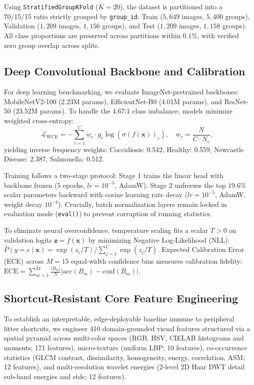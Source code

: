 \documentclass[conference]{IEEEtran}
\begin{document}
Using \texttt{StratifiedGroupKFold} ($K=20$), the dataset is partitioned into a 70/15/15 ratio strictly grouped by \texttt{group\_id}: Train ($5{,}649$ images, $5{,}400$ groups), Validation ($1{,}209$ images, $1{,}156$ groups), and Test ($1{,}209$ images, $1{,}158$ groups). All class proportions are preserved across partitions within $0.1\%$, with verified zero group overlap across splits.

\subsection{Deep Convolutional Backbone and Calibration}
For deep learning benchmarking, we evaluate ImageNet-pretrained backbones: MobileNetV2-100 (2.23M params), EfficientNet-B0 (4.01M params), and ResNet-50 (23.52M params). To handle the 4.67:1 class imbalance, models minimize weighted cross-entropy:
\begin{equation}
\mathcal{L}_{\text{WCE}} = - \sum_{c=1}^C w_c \cdot y_c \log(\sigma(f(\mathbf{x}))_c), \quad w_c = \frac{N}{C \cdot N_c},
\end{equation}
yielding inverse frequency weights: Coccidiosis: 0.542, Healthy: 0.559, Newcastle Disease: 2.387, Salmonella: 0.512.

Training follows a two-stage protocol: Stage 1 trains the linear head with backbone frozen ($5$ epochs, $lr = 10^{-3}$, AdamW). Stage 2 unfreezes the top $19.6\%$ scalar parameters backward with cosine learning rate decay ($lr = 10^{-5}$, AdamW, weight decay $10^{-4}$). Crucially, batch normalization layers remain locked in evaluation mode (\texttt{eval()}) to prevent corruption of running statistics.

To eliminate neural overconfidence, temperature scaling fits a scalar $T > 0$ on validation logits $\mathbf{z} = f(\mathbf{x})$ by minimizing Negative Log-Likelihood (NLL): $\hat{P}(y = c \mid \mathbf{x}) = \exp(z_c / T) / \sum_{j=1}^C \exp(z_j / T)$. Expected Calibration Error (ECE) across $M=15$ equal-width confidence bins measures calibration fidelity: $\text{ECE} = \sum_{m=1}^M \frac{|B_m|}{N} | \text{acc}(B_m) - \text{conf}(B_m) |$.

\subsection{Shortcut-Resistant Core Feature Engineering}
To establish an interpretable, edge-deployable baseline immune to peripheral litter shortcuts, we engineer 410 domain-grounded visual features structured via a spatial pyramid across multi-color spaces (RGB, HSV, CIELAB histograms and moments; 171 features), micro-texture (uniform LBP; 10 features), co-occurrence statistics (GLCM contrast, dissimilarity, homogeneity, energy, correlation, ASM; 12 features), and multi-resolution wavelet energies (2-level 2D Haar DWT detail sub-band energies and stds; 12 features).
\end{document}
